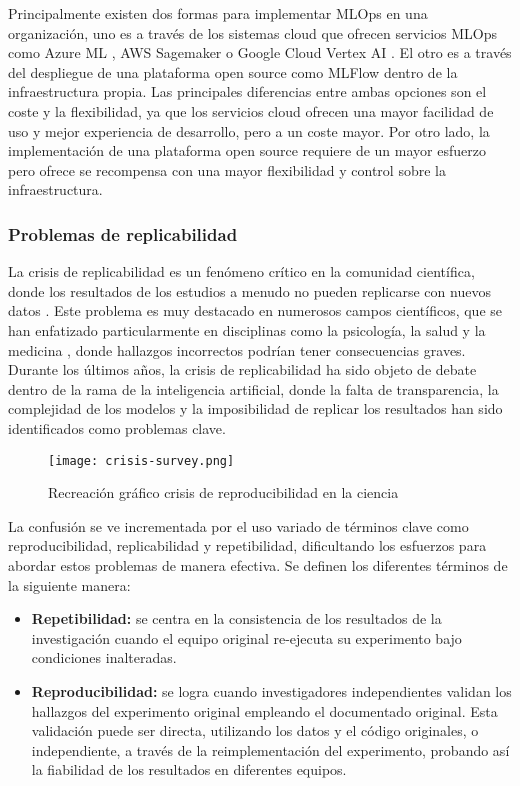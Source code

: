 Principalmente existen dos formas para implementar MLOps en una organización, uno es
a través de los sistemas cloud que ofrecen servicios MLOps como Azure ML \cite{microsoft2023azureml}, 
AWS Sagemaker \cite{aws_sagemaker} o Google Cloud Vertex AI \cite{google2023vertexai}. El otro es a través del despliegue de una plataforma open source
como MLFlow dentro de la infraestructura propia. Las principales diferencias entre ambas
opciones son el coste y la flexibilidad, ya que los servicios cloud ofrecen una mayor
facilidad de uso y mejor experiencia de desarrollo, pero a un coste mayor. Por otro lado,
la implementación de una plataforma open source requiere de un mayor esfuerzo pero ofrece
se recompensa con una mayor flexibilidad y control sobre la infraestructura.

\subsubsection{Problemas de replicabilidad}
La crisis de replicabilidad es un fenómeno crítico en la comunidad científica,  
donde los resultados de los estudios a menudo no pueden replicarse con nuevos datos \cite{puetz2024replication}.
Este problema es muy destacado en numerosos campos científicos, que se han enfatizado particularmente 
en disciplinas como la psicología, la salud y la medicina \cite{puetz2024replication}\cite{Baker_2016}, donde hallazgos incorrectos 
podrían tener consecuencias graves. Durante los últimos años, la crisis de replicabilidad ha
sido objeto de debate dentro de la rama de la inteligencia artificial, donde la falta de
transparencia, la complejidad de los modelos y la imposibilidad de replicar los resultados
han sido identificados como problemas clave.

\begin{figure}[ht]
    \centering
    \texttt{[image: crisis-survey.png]}
    \caption{Recreación gráfico crisis de reproducibilidad en la ciencia \cite{Baker_2016}}\label{fig:crisis-survey}
\end{figure}

La confusión se ve incrementada por el uso variado de términos clave como reproducibilidad, 
replicabilidad y repetibilidad, \cite{readytensor} dificultando los esfuerzos para abordar estos problemas de 
manera efectiva. Se definen los diferentes términos de la siguiente manera:
\begin{itemize}
    \item \textbf{Repetibilidad:} se centra en la consistencia de los resultados de la investigación cuando el equipo 
    original re-ejecuta su experimento bajo condiciones inalteradas. 
    \item \textbf {Reproducibilidad:} se logra cuando investigadores independientes validan los hallazgos del 
    experimento original empleando el documentado original. Esta validación puede ser directa, utilizando 
    los datos y el código originales, o independiente, a través de la reimplementación del experimento, 
    probando así la fiabilidad de los resultados en diferentes equipos.
\end{itemize}

